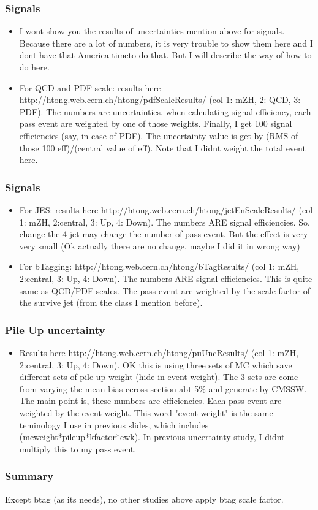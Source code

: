 \documentclass{beamer}
\begin{document}
\begin{frame}
  \frametitle{Signals}
  \justifying
  \begin{itemize}
  \item I wont show you the results of uncertainties mention above for signals. Because there are a lot of numbers, it is very trouble to show them here and I dont have that America timeto do that. But I will describe the way of how to do here.
  \item For QCD and PDF scale: results here http://htong.web.cern.ch/htong/pdfScaleResults/ (col 1: mZH, 2: QCD, 3: PDF). The numbers are uncertainties. when calculating signal efficiency, each pass event are weighted by one of those weights. Finally, I get 100 signal efficiencies (say, in case of PDF). The uncertainty value is get by (RMS of those 100 eff)/(central value of eff). Note that I didnt weight the total event here.
  \end{itemize}
\end{frame}

\begin{frame}
  \frametitle{Signals}
  \justifying
  \begin{itemize}
  \item For JES: results here http://htong.web.cern.ch/htong/jetEnScaleResults/ (col 1: mZH, 2:central, 3: Up, 4: Down). The numbers ARE signal efficiencies. So, change the 4-jet may change the number of pass event. But the effect is very very small (Ok actually there are no change, maybe I did it in wrong way)
  \item For bTagging: http://htong.web.cern.ch/htong/bTagResults/ (col 1: mZH, 2:central, 3: Up, 4: Down). The numbers ARE signal efficiencies. This is quite same as QCD/PDF scales. The pass event are weighted by the scale factor of the survive jet (from the class I mention before).
  \end{itemize}
\end{frame}

\begin{frame}
  \frametitle{Pile Up uncertainty}
  \justifying
  \begin{itemize}
  \item Results here http://htong.web.cern.ch/htong/puUncResults/ (col 1: mZH, 2:central, 3: Up, 4: Down). OK this is using three sets of MC which save different sets of pile up weight (hide in event weight). The 3 sets are come from varying the mean bias ccross section abt 5\% and generate by CMSSW. The main point is, these numbers are efficiencies. Each pass event are weighted by the event weight. This word "event weight" is the same teminology I use in previous slides, which includes (mcweight*pileup*kfactor*ewk). In previous uncertainty study, I didnt multiply this to my pass event.
  \end{itemize} 
\end{frame}

\begin{frame}
  \frametitle{Summary}
  \justifying
  Except btag (as its needs), no other studies above apply btag scale factor.
\end{frame}
\end{document}
